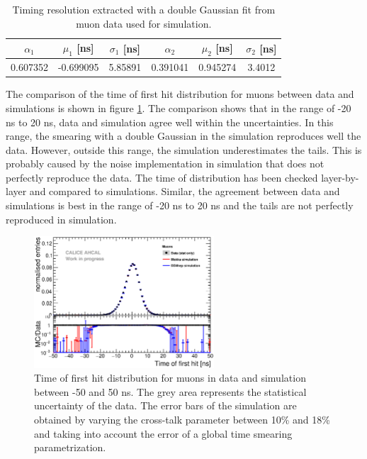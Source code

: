 \begin{table}[htb!]
	\centering
	\caption{Timing resolution extracted with a double Gaussian fit from muon data used for simulation.}
	\label{table:time_res_sim}
	\begin{tabular}{@{} cccccc @{}}
		\toprule
		$\alpha_{1}$ & $\mu_{1}$ [ns] & $\sigma_{1}$ [ns] & $\alpha_{2}$ & $\mu_{2}$ [ns] & $\sigma_{2}$ [ns] \\
		\midrule
		0.607352 & -0.699095 & 5.85891 & 0.391041 & 0.945274 & 3.4012 \\
		\bottomrule
	\end{tabular}
\end{table}

The comparison of the time of first hit distribution for muons between data and simulations is shown in figure \ref{fig:sim_data_muon}. The comparison shows that in the range of -20 ns to 20 ns, data and simulation agree well within the uncertainties. In this range, the smearing with a double Gaussian in the simulation reproduces well the data. However, outside this range, the simulation underestimates the tails. This is probably caused by the noise implementation in simulation that does not perfectly reproduce the data. The time of distribution has been checked layer-by-layer and compared to simulations. Similar, the agreement between data and simulations is best in the range of -20 ns to 20 ns and the tails are not perfectly reproduced in simulation.

\begin{figure}[htbp!]
	\centering
	\includegraphics[width=0.6\textwidth]{../Thesis_Plots/Timing/Muons/Plots/Comparison_MokkaDD4hepData_Muons.eps}
	\caption{Time of first hit distribution for muons in data and simulation between -50 and 50 ns. The grey area represents the statistical uncertainty of the data. The error bars of the simulation are obtained by varying the cross-talk parameter between 10\% and 18\% and taking into account the error of a global time smearing parametrization.}
	\label{fig:sim_data_muon}
\end{figure}

